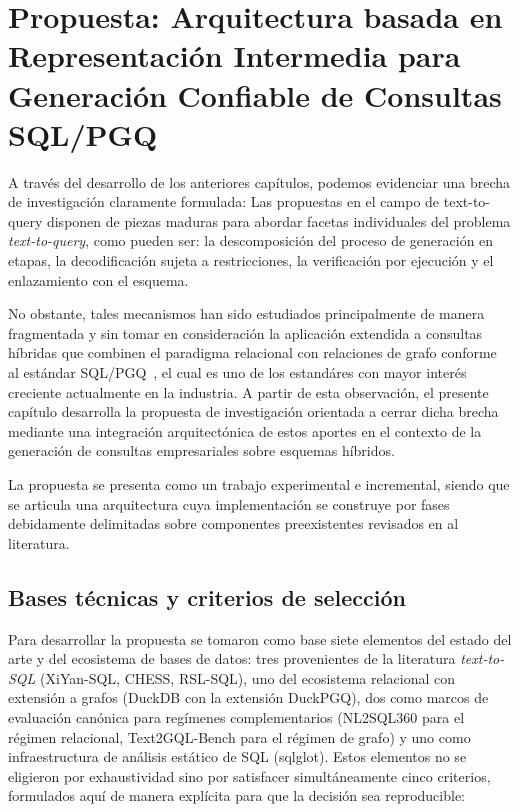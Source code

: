 
\chapter{Propuesta: Arquitectura basada en Representación Intermedia para Generación Confiable de Consultas SQL/PGQ}
\label{chap:proposal}

A través del desarrollo de los anteriores capítulos, podemos evidenciar una brecha de investigación claramente formulada: Las propuestas en el campo de text-to-query disponen de piezas maduras para abordar facetas individuales del problema \emph{text-to-query}, como pueden ser: la descomposición del proceso de generación en etapas, la decodificación sujeta a restricciones, la verificación por ejecución y el enlazamiento con el esquema.  %

No obstante, tales mecanismos han sido estudiados principalmente de manera fragmentada y sin tomar en consideración la aplicación extendida a consultas híbridas que combinen el paradigma relacional con relaciones de grafo conforme al estándar \ac{SQL}/\ac{PGQ}~\cite{ISO9075_16_2023}, el cual es uno de los estandáres con mayor interés creciente actualmente en la industria. A partir de esta observación, el presente capítulo desarrolla la propuesta de investigación orientada a cerrar dicha brecha mediante una integración arquitectónica de estos aportes en el contexto de la generación de consultas empresariales sobre esquemas híbridos.

La propuesta se presenta como un trabajo experimental e incremental, siendo que se articula una arquitectura cuya implementación se construye por fases debidamente delimitadas sobre componentes preexistentes revisados en al literatura.  %

\section{Bases técnicas y criterios de selección}
\label{sec:prop-bases}

Para desarrollar la propuesta se tomaron como base siete elementos del estado del arte y del ecosistema de bases de datos: tres provenientes de la literatura \emph{text-to-SQL} (XiYan-SQL, CHESS, RSL-SQL), uno del ecosistema relacional con extensión a grafos (DuckDB con la extensión DuckPGQ), dos como marcos de evaluación canónica para regímenes complementarios (NL2SQL360 para el régimen relacional, Text2GQL-Bench para el régimen de grafo) y uno como infraestructura de análisis estático de SQL (sqlglot). Estos elementos no se eligieron por exhaustividad sino por satisfacer simultáneamente cinco criterios, formulados aquí de manera explícita para que la decisión sea reproducible:

